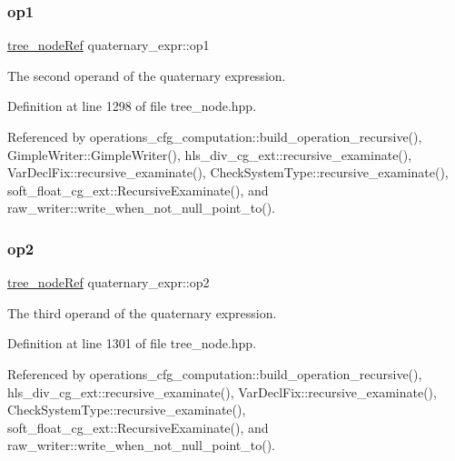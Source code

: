 \mbox{\label{structquaternary__expr_a10aa98ea0339bf515fb06eed6b104dbb}} 
\subsubsection{\texorpdfstring{op1}{op1}}
{\footnotesize\ttfamily \hyperlink{tree__node_8hpp_a6ee377554d1c4871ad66a337eaa67fd5}{tree\+\_\+node\+Ref} quaternary\+\_\+expr\+::op1}



The second operand of the quaternary expression. 



Definition at line 1298 of file tree\+\_\+node.\+hpp.



Referenced by operations\+\_\+cfg\+\_\+computation\+::build\+\_\+operation\+\_\+recursive(), Gimple\+Writer\+::\+Gimple\+Writer(), hls\+\_\+div\+\_\+cg\+\_\+ext\+::recursive\+\_\+examinate(), Var\+Decl\+Fix\+::recursive\+\_\+examinate(), Check\+System\+Type\+::recursive\+\_\+examinate(), soft\+\_\+float\+\_\+cg\+\_\+ext\+::\+Recursive\+Examinate(), and raw\+\_\+writer\+::write\+\_\+when\+\_\+not\+\_\+null\+\_\+point\+\_\+to().

\mbox{\label{structquaternary__expr_abcc2e94e3c0589b52407b01ca54f1d1f}} 
\subsubsection{\texorpdfstring{op2}{op2}}
{\footnotesize\ttfamily \hyperlink{tree__node_8hpp_a6ee377554d1c4871ad66a337eaa67fd5}{tree\+\_\+node\+Ref} quaternary\+\_\+expr\+::op2}



The third operand of the quaternary expression. 



Definition at line 1301 of file tree\+\_\+node.\+hpp.



Referenced by operations\+\_\+cfg\+\_\+computation\+::build\+\_\+operation\+\_\+recursive(), hls\+\_\+div\+\_\+cg\+\_\+ext\+::recursive\+\_\+examinate(), Var\+Decl\+Fix\+::recursive\+\_\+examinate(), Check\+System\+Type\+::recursive\+\_\+examinate(), soft\+\_\+float\+\_\+cg\+\_\+ext\+::\+Recursive\+Examinate(), and raw\+\_\+writer\+::write\+\_\+when\+\_\+not\+\_\+null\+\_\+point\+\_\+to().

